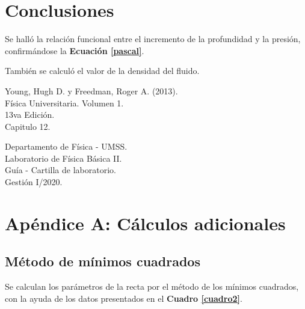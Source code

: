 \documentclass[letter,11pt]{article}
\begin{document}
\section{Conclusiones}

Se halló la relación funcional entre el incremento de la profundidad y
la presión, confirmándose la \textbf{Ecuación \ref{pascal}}.

También se calculó el valor de la densidad del fluido.

\begin{thebibliography}{99}

 Young, Hugh D. y Freedman, Roger A. (2013).\\
Física Universitaria. Volumen 1.\\
13va Edición.\\
Capitulo 12.

 Departamento de Física - UMSS.\\
Laboratorio de Física Básica II.\\
Guía - Cartilla de laboratorio.\\
Gestión I/2020.

\end{thebibliography}

\newpage
\section*{Apéndice A: Cálculos adicionales}

\subsection{Método de mínimos cuadrados}

Se calculan los parámetros de la recta por el método de los mínimos cuadrados,
con la ayuda de los datos presentados en el \textbf{Cuadro \ref{cuadro2}}.
\end{document}
